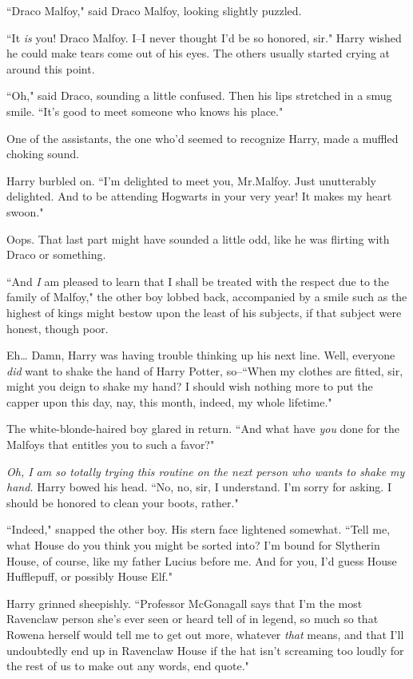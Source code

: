 ``Draco Malfoy," said Draco Malfoy, looking slightly puzzled.

``It \emph{is} you! Draco Malfoy. I\---I never thought I'd be so honored, sir." Harry wished he could make tears come out of his eyes. The others usually started crying at around this point.

``Oh," said Draco, sounding a little confused. Then his lips stretched in a smug smile. ``It's good to meet someone who knows his place."

One of the assistants, the one who'd seemed to recognize Harry, made a muffled choking sound.

Harry burbled on. ``I'm delighted to meet you, Mr.\?Malfoy. Just unutterably delighted. And to be attending Hogwarts in your very year! It makes my heart swoon."

Oops. That last part might have sounded a little odd, like he was flirting with Draco or something.

``And \emph{I} am pleased to learn that I shall be treated with the respect due to the family of Malfoy," the other boy lobbed back, accompanied by a smile such as the highest of kings might bestow upon the least of his subjects, if that subject were honest, though poor.

Eh{\ldots} Damn, Harry was having trouble thinking up his next line. Well, everyone \emph{did} want to shake the hand of Harry Potter, so\---``When my clothes are fitted, sir, might you deign to shake my hand? I should wish nothing more to put the capper upon this day, nay, this month, indeed, my whole lifetime."

The white-blonde-haired boy glared in return. ``And what have \emph{you} done for the Malfoys that entitles you to such a favor?"

\emph{Oh, I am so totally trying this routine on the next person who wants to shake my hand.} Harry bowed his head. ``No, no, sir, I understand. I'm sorry for asking. I should be honored to clean your boots, rather."

``Indeed," snapped the other boy. His stern face lightened somewhat. ``Tell me, what House do you think you might be sorted into? I'm bound for Slytherin House, of course, like my father Lucius before me. And for you, I'd guess House Hufflepuff, or possibly House Elf."

Harry grinned sheepishly. ``Professor McGonagall says that I'm the most Ravenclaw person she's ever seen or heard tell of in legend, so much so that Rowena herself would tell me to get out more, whatever \emph{that} means, and that I'll undoubtedly end up in Ravenclaw House if the hat isn't screaming too loudly for the rest of us to make out any words, end quote."


